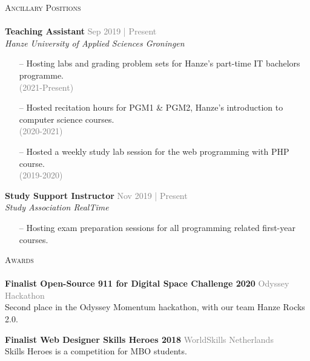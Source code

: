 \documentclass[a4paper]{article}
\newcommand{\lineunder} {
    \vspace*{-8pt} \\
    \hspace*{-18pt} \hrulefill \\
}
\newcommand{\header} [1] {
    {\hspace*{-18pt}\vspace*{6pt} \textsc{#1}}
    \vspace*{-6pt} \lineunder
}
\begin{document}
\header{Ancillary Positions}
\vspace{1mm}
\textbf{Teaching Assistant} \hfill \textcolor{gray}{Sep 2019 | Present}\\
\textit{Hanze University of Applied Sciences Groningen}\\
\vspace{-2mm}
\begin{itemize} \itemsep 1pt
	\item[--] Hosting labs and grading problem sets for Hanze’s part-time IT bachelors programme.\\ \textcolor{gray}{(2021-Present)}
	\item[--] Hosted recitation hours for PGM1 \& PGM2, Hanze’s introduction to computer science courses.\\\textcolor{gray}{(2020-2021)}
	\item[--]Hosted a weekly study lab session for the web programming with PHP course.\\
		\textcolor{gray}{(2019-2020)}
\end{itemize}
\textbf{Study Support Instructor} \hfill \textcolor{gray}{Nov 2019 | Present}\\
\textit{Study Association RealTime}\\
\vspace{-2mm}
\begin{itemize} \itemsep 1pt
	\item[--] Hosting exam preparation sessions for all programming related first-year courses.
\end{itemize}

\vspace{2mm}

\vspace{5mm}

\header{Awards}
\textbf{Finalist Open-Source 911 for Digital Space Challenge 2020} \hfill \textcolor{gray}{Odyssey Hackathon}\\
Second place in the Odyssey Momentum hackathon, with our team Hanze Rocks 2.0.
\vspace*{2mm}

\textbf{Finalist Web Designer Skills Heroes 2018} \hfill \textcolor{gray}{WorldSkills Netherlands}\\
Skills Heroes is a competition for MBO students.
\vspace*{2mm}

\ 
\end{document}

